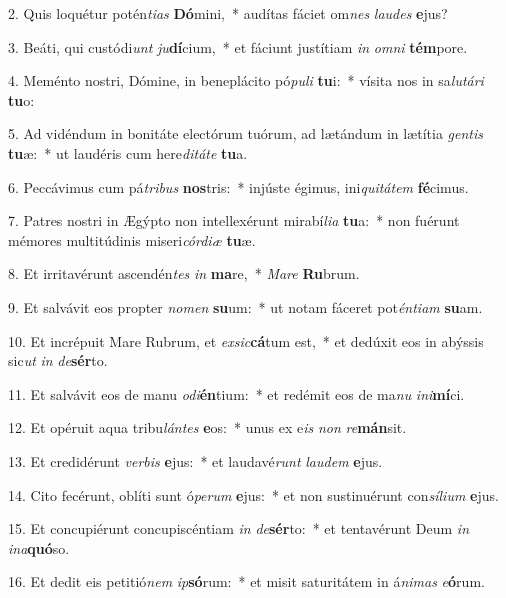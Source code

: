 2. Quis loquétur potén\textit{ti}\textit{as} \textbf{Dó}mini,~*  audítas fáciet om\textit{nes} \textit{lau}\textit{des} \textbf{e}jus?\

3. Beáti, qui custódi\textit{unt} \textit{ju}\textbf{dí}cium,~*  et fáciunt justítiam \textit{in} \textit{om}\textit{ni} \textbf{tém}pore.\

4. Meménto nostri, Dómine, in beneplácito pó\textit{pu}\textit{li} \textbf{tu}i:~*  vísita nos in sa\textit{lu}\textit{tá}\textit{ri} \textbf{tu}o:\

5. Ad vidéndum in bonitáte electórum tuórum, ad lætándum in lætítia \textit{gen}\textit{tis} \textbf{tu}æ:~*  ut laudéris cum here\textit{di}\textit{tá}\textit{te} \textbf{tu}a.\

6. Peccávimus cum pá\textit{tri}\textit{bus} \textbf{nos}tris:~*  injúste égimus, ini\textit{qui}\textit{tá}\textit{tem} \textbf{fé}cimus.\

7. Patres nostri in Ægýpto non intellexérunt mirabí\textit{li}\textit{a} \textbf{tu}a:~*  non fuérunt mémores multitúdinis miseri\textit{cór}\textit{di}\textit{æ} \textbf{tu}æ.\

8. Et irritavérunt ascendén\textit{tes} \textit{in} \textbf{ma}re,~*  \textit{Ma}\textit{re} \textbf{Ru}brum.\

9. Et salvávit eos propter \textit{no}\textit{men} \textbf{su}um:~*  ut notam fáceret pot\textit{én}\textit{ti}\textit{am} \textbf{su}am.\

10. Et incrépuit Mare Rubrum, et \textit{ex}\textit{sic}\textbf{cá}tum est,~*  et dedúxit eos in abýssis sic\textit{ut} \textit{in} \textit{de}\textbf{sér}to.\

11. Et salvávit eos de manu \textit{o}\textit{di}\textbf{én}tium:~*  et redémit eos de ma\textit{nu} \textit{in}\textit{i}\textbf{mí}ci.\

12. Et opéruit aqua tribu\textit{lán}\textit{tes} \textbf{e}os:~*  unus ex e\textit{is} \textit{non} \textit{re}\textbf{mán}sit.\

13. Et credidérunt \textit{ver}\textit{bis} \textbf{e}jus:~*  et laudavé\textit{runt} \textit{lau}\textit{dem} \textbf{e}jus.\

14. Cito fecérunt, oblíti sunt ó\textit{pe}\textit{rum} \textbf{e}jus:~*  et non sustinuérunt con\textit{sí}\textit{li}\textit{um} \textbf{e}jus.\

15. Et concupiérunt concupiscéntiam \textit{in} \textit{de}\textbf{sér}to:~*  et tentavérunt Deum \textit{in} \textit{in}\textit{a}\textbf{quó}so.\

16. Et dedit eis petitió\textit{nem} \textit{ip}\textbf{só}rum:~*  et misit saturitátem in á\textit{ni}\textit{mas} \textit{e}\textbf{ó}rum.\

